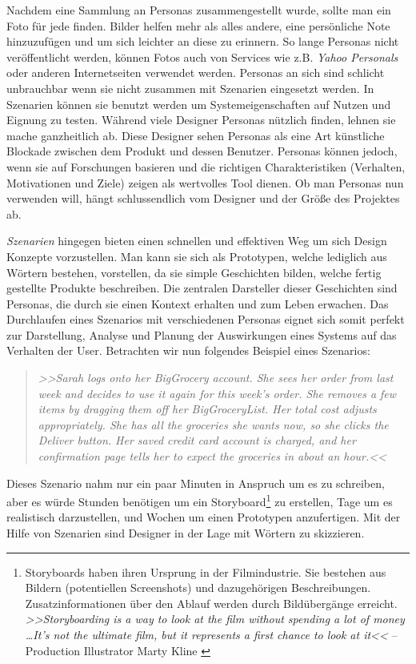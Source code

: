 \medskip Nachdem eine Sammlung an Personas zusammengestellt wurde, sollte man ein Foto für jede finden. Bilder helfen mehr als alles andere, eine persönliche Note hinzuzufügen und um sich leichter an diese zu erinnern. So lange Personas nicht veröffentlicht werden, können Fotos auch von Services wie z.B. \emph{Yahoo Personals} oder anderen Internetseiten verwendet werden. Personas an sich sind schlicht unbrauchbar wenn sie nicht zusammen mit Szenarien eingesetzt werden. In Szenarien können sie benutzt werden um Systemeigenschaften auf Nutzen und Eignung zu testen. 
Während viele Designer Personas nützlich finden, lehnen sie mache ganzheitlich ab. Diese Designer sehen Personas als eine Art künstliche Blockade zwischen dem Produkt und dessen Benutzer. Personas können jedoch, wenn sie auf Forschungen basieren und die richtigen Charakteristiken (Verhalten, Motivationen und Ziele) zeigen als wertvolles Tool dienen. Ob man Personas nun verwenden will, hängt schlussendlich vom Designer und der Größe des Projektes ab. \citep{Saffer:2007}

\medskip \emph{Szenarien} hingegen bieten einen schnellen und effektiven Weg um sich Design Konzepte vorzustellen. Man kann sie sich als Prototypen, welche lediglich aus Wörtern bestehen, vorstellen, da sie simple Geschichten bilden, welche fertig gestellte Produkte beschreiben. Die zentralen Darsteller dieser Geschichten sind Personas, die durch sie einen Kontext erhalten und zum Leben erwachen. Das Durchlaufen eines Szenarios mit verschiedenen Personas eignet sich somit perfekt zur Darstellung, Analyse und Planung der Auswirkungen eines Systems auf das Verhalten der User. Betrachten wir nun folgendes Beispiel eines Szenarios:

\begin{quote}
	\textsl{>>Sarah logs onto her BigGrocery account. She sees her order from last week and decides to use it again for this week's order. She removes a few items by dragging them off her BigGroceryList. Her total cost adjusts appropriately. She has all the groceries she wants now, so she clicks the Deliver button. Her saved credit card account is charged, and her confirmation page tells her to expect the groceries in about an hour.<<}
	 \begin{flushright} \citep{Saffer:2007} \end{flushright}
\end{quote}

Dieses Szenario nahm nur ein paar Minuten in Anspruch um es zu schreiben, aber es würde Stunden benötigen um ein Storyboard\footnote{Storyboards haben ihren Ursprung in der Filmindustrie. Sie bestehen aus Bildern (potentiellen Screenshots) und dazugehörigen Beschreibungen. Zusatzinformationen über den Ablauf werden durch Bildübergänge  erreicht. \emph{>>Storyboarding is a way to look at the film without spending a lot of money \ldots It’s not the ultimate film, but it represents a first chance to look at it<<} -- Production Illustrator Marty Kline \citep{Braa:1989}}  zu erstellen, Tage um es realistisch darzustellen, und Wochen um einen Prototypen anzufertigen. Mit der Hilfe von Szenarien sind Designer in der Lage mit Wörtern zu skizzieren. \citep{Saffer:2007} 

